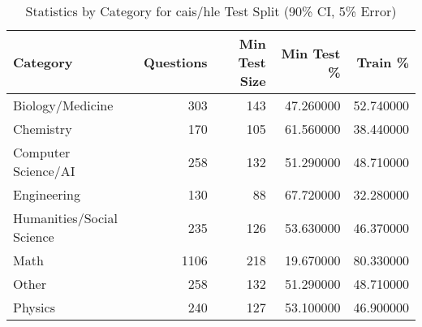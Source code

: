 \begin{table}[H]
\centering
\begin{tabular}{lrrrr}
\toprule
Category & Questions & Min Test Size & Min Test \% & Train \% \\
\midrule
Biology/Medicine & 303 & 143 & 47.260000 & 52.740000 \\
Chemistry & 170 & 105 & 61.560000 & 38.440000 \\
Computer Science/AI & 258 & 132 & 51.290000 & 48.710000 \\
Engineering & 130 & 88 & 67.720000 & 32.280000 \\
Humanities/Social Science & 235 & 126 & 53.630000 & 46.370000 \\
Math & 1106 & 218 & 19.670000 & 80.330000 \\
Other & 258 & 132 & 51.290000 & 48.710000 \\
Physics & 240 & 127 & 53.100000 & 46.900000 \\
\bottomrule
\end{tabular}
\vspace{0.2cm}
\caption{Statistics by Category for cais/hle Test Split (90\% CI, 5\% Error)}
\label{tab:split_analysis}
\end{table}
